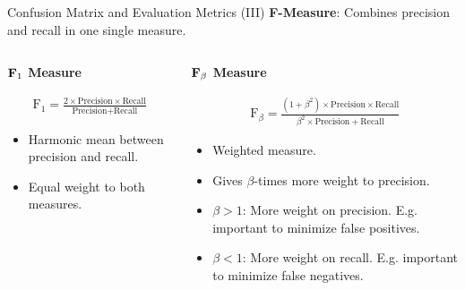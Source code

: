 \begin{frame}{Confusion Matrix and Evaluation Metrics (III)}
	\textbf{F-Measure}: Combines precision and recall in one single measure.
	\vspace*{-1em}
	\begin{columns}
		\begin{column}{0.5\textwidth}
			\begin{center}
				\textbf{$\text{\textbf{F}}_1$ Measure}
			\end{center}
			\begin{align*}
				\text{F}_1 = \frac{2 \times \text{Precision} \times \text{Recall}}{\text{Precision} + \text{Recall}}
			\end{align*}

			\begin{itemize}
				\item Harmonic mean between precision and recall.
				\item Equal weight to both measures.
			\end{itemize}
		\end{column}

		\begin{column}{0.5\textwidth}
			\begin{center}
				\textbf{$\text{\textbf{F}}_\beta$ Measure}
			\end{center}
			\vspace*{-.5em}
			\begin{align*}
				\text{F}_\beta = \frac{(1 + \beta^2) \times \text{Precision} \times \text{Recall}}{\beta^2 \times \text{Precision} + \text{Recall}}
			\end{align*}

			\begin{itemize}
				\item Weighted measure.
				\item Gives $\beta$-times more weight to precision.
				\item $\beta > 1$: More weight on precision. E.g. important to minimize false positives.
				\item $\beta < 1$: More weight on recall. E.g. important to minimize false negatives.
			\end{itemize}
		\end{column}
	\end{columns}
\end{frame}

